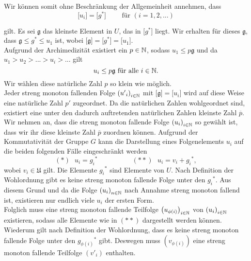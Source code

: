 {%
Wir können somit ohne Beschränkung der Allgemeinheit annehmen, dass
\[\lbrack u_i \rbrack = \lbrack g^*\rbrack ~~~~~~~~~\text{ für }\left(i = 1, 2,...\right)\]

gilt.
%
Es sei $\mathfrak{g}$ das kleinste Element in $U$, das in $\lbrack g^*\rbrack$ liegt. Wir erhalten für dieses $\mathfrak{g}$, dass $\mathfrak{g}\leq g^*\leq u_1$ ist, wobei $\lbrack \mathfrak{g}\rbrack = \lbrack g^*\rbrack = \lbrack u_1 \rbrack$.\\
%
%
Aufgrund der Archimedizität existiert ein $p \in \mathbb{N}$, sodass $u_1 \le p\mathfrak{g}$ und da $u_1 > u_2 > ... > u_i > ...$ gilt 
\[u_i \le p\mathfrak{g}\text{ für alle }i \in \mathbb{N}.\] 
%
%
Wir wählen diese natürliche Zahl $p$ so klein wie möglich. \\
%
%
Jeder streng monoton fallenden Folge $\left({u'}_i\right)_{i\in\mathbb{N}}$ mit $\lbrack \mathfrak{g}\rbrack = \lbrack u_i \rbrack$ %
wird auf diese Weise eine natürliche Zahl $p'$ zugeordnet. Da die natürlichen Zahlen wohlgeordnet sind, existiert eine unter den dadurch auftretenden natürlichen Zahlen kleinste Zahl $\overline{p}$. Wir nehmen an, dass die streng monoton fallende Folge $\left(u_i\right)_{i\in\mathbb{N}}$ so gewählt ist, dass wir ihr diese kleinste Zahl $\overline{p}$ zuordnen können.
%
%
%
%
Aufgrund der Kommutativität der Gruppe $G$ kann die Darstellung eines Folgenelements $u_i$ auf die beiden folgenden Fälle eingeschränkt werden
%
\[
(*)~~~ u_i = {g_i}^* ~~~~~~~~~~~~~~~~~~~~~~~   (**)~~~    u_i = v_i+{g_i}^*,
\]
%
%
%
wobei $v_i \in \mathfrak{U}$ gilt. 
Die Elemente ${g_i}^*$ sind Elemente von $U$. Nach Definition der Wohlordnung gibt es keine streng monoton fallende Folge unter den ${g_i}^*$. Aus diesem Grund und da die Folge ${\left(u_i\right)}_{n\in \mathbb{N}}$ nach Annahme streng monoton fallend ist, existieren nur endlich viele $u_i$ der ersten Form. \\
%
%
%
%

%
%
%
Folglich muss eine streng monoton fallende Teilfolge $\left(u_{\phi(i)}\right)_{i\in\mathbb{N}}$ von $\left(u_i\right)_{i\in\mathbb{N}}$ existieren, sodass alle Elemente wie in $(**)$ dargestellt werden können. Wiederum gilt nach Definition der Wohlordnung, dass es keine streng monoton fallende Folge unter den ${g_{\phi(i)}}^*$  gibt. Deswegen muss $\left({v_{\phi(i)}}\right)$ eine streng monoton fallende Teilfolge $\left({{v'}_{i}}\right) $ enthalten.

}

